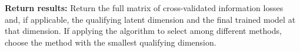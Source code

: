 \begin{algorithm}
\begin{algorithmic}[1]
\State \textbf{Return results:} Return the full matrix of cross-validated information losses and, if applicable, the qualifying latent dimension and the final trained model at that dimension. If applying the algorithm to select among different methods, choose the method with the smallest qualifying dimension.

\end{algorithmic}
\end{algorithm}


